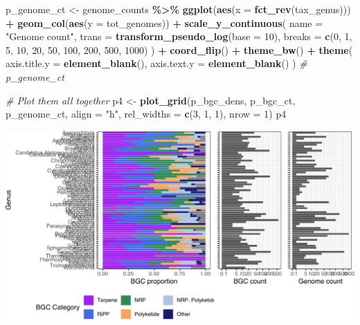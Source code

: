 \documentclass[
]{article}
\newenvironment{Shaded}{\begin{snugshade}}{\end{snugshade}}
\newcommand{\AttributeTok}[1]{\textcolor[rgb]{0.13,0.29,0.53}{#1}}
\newcommand{\CommentTok}[1]{\textcolor[rgb]{0.56,0.35,0.01}{\textit{#1}}}
\newcommand{\DecValTok}[1]{\textcolor[rgb]{0.00,0.00,0.81}{#1}}
\newcommand{\FunctionTok}[1]{\textcolor[rgb]{0.13,0.29,0.53}{\textbf{#1}}}
\newcommand{\NormalTok}[1]{#1}
\newcommand{\OtherTok}[1]{\textcolor[rgb]{0.56,0.35,0.01}{#1}}
\newcommand{\SpecialCharTok}[1]{\textcolor[rgb]{0.81,0.36,0.00}{\textbf{#1}}}
\newcommand{\StringTok}[1]{\textcolor[rgb]{0.31,0.60,0.02}{#1}}
\begin{document}
\begin{Shaded}
\begin{Highlighting}[]
\NormalTok{p\_genome\_ct }\OtherTok{\textless{}{-}}\NormalTok{ genome\_counts }\SpecialCharTok{\%\textgreater{}\%}
  \FunctionTok{ggplot}\NormalTok{(}\FunctionTok{aes}\NormalTok{(}\AttributeTok{x =} \FunctionTok{fct\_rev}\NormalTok{(tax\_genus))) }\SpecialCharTok{+}
  \FunctionTok{geom\_col}\NormalTok{(}\FunctionTok{aes}\NormalTok{(}\AttributeTok{y =}\NormalTok{ tot\_genomes)) }\SpecialCharTok{+}
  \FunctionTok{scale\_y\_continuous}\NormalTok{(}
    \AttributeTok{name =} \StringTok{"Genome count"}\NormalTok{,}
    \AttributeTok{trans =} \FunctionTok{transform\_pseudo\_log}\NormalTok{(}\AttributeTok{base =} \DecValTok{10}\NormalTok{),}
    \AttributeTok{breaks =} \FunctionTok{c}\NormalTok{(}\DecValTok{0}\NormalTok{, }\DecValTok{1}\NormalTok{, }\DecValTok{5}\NormalTok{, }\DecValTok{10}\NormalTok{, }\DecValTok{20}\NormalTok{, }\DecValTok{50}\NormalTok{, }\DecValTok{100}\NormalTok{, }\DecValTok{200}\NormalTok{, }\DecValTok{500}\NormalTok{, }\DecValTok{1000}\NormalTok{)}
\NormalTok{  ) }\SpecialCharTok{+}
  \FunctionTok{coord\_flip}\NormalTok{() }\SpecialCharTok{+}
  \FunctionTok{theme\_bw}\NormalTok{() }\SpecialCharTok{+}
  \FunctionTok{theme}\NormalTok{(}
    \AttributeTok{axis.title.y =} \FunctionTok{element\_blank}\NormalTok{(),}
    \AttributeTok{axis.text.y =} \FunctionTok{element\_blank}\NormalTok{()}
\NormalTok{  )}
\CommentTok{\# p\_genome\_ct}

\CommentTok{\# Plot them all together}
\NormalTok{p4 }\OtherTok{\textless{}{-}} \FunctionTok{plot\_grid}\NormalTok{(p\_bgc\_dens, p\_bgc\_ct, p\_genome\_ct, }\AttributeTok{align =} \StringTok{"h"}\NormalTok{, }\AttributeTok{rel\_widths =} \FunctionTok{c}\NormalTok{(}\DecValTok{3}\NormalTok{, }\DecValTok{1}\NormalTok{, }\DecValTok{1}\NormalTok{), }\AttributeTok{nrow =} \DecValTok{1}\NormalTok{)}
\NormalTok{p4}
\end{Highlighting}
\end{Shaded}

\includegraphics{analysis_files/figure-latex/unnamed-chunk-14-1.pdf}
\end{document}
